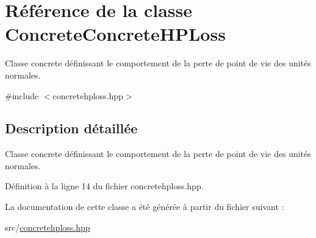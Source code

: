 \hypertarget{classConcreteConcreteHPLoss}{\section{Référence de la classe Concrete\+Concrete\+H\+P\+Loss}
\label{classConcreteConcreteHPLoss}
}


Classe concrete définissant le comportement de la perte de point de vie des unités normales.  




{\ttfamily \#include $<$concretehploss.\+hpp$>$}



\subsection{Description détaillée}
Classe concrete définissant le comportement de la perte de point de vie des unités normales. 

Définition à la ligne 14 du fichier concretehploss.\+hpp.



La documentation de cette classe a été générée à partir du fichier suivant \+:\begin{DoxyCompactItemize}
\item 
src/\hyperlink{concretehploss_8hpp}{concretehploss.\+hpp}\end{DoxyCompactItemize}

